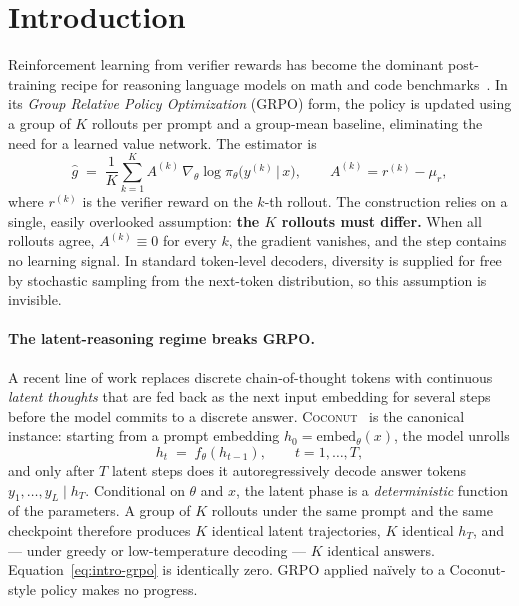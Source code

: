 
\section{Introduction}
\label{sec:intro}

Reinforcement learning from verifier rewards has become the dominant
post-training recipe for reasoning language models on math and code
benchmarks~\citep{shao2024deepseekmath,yu2024dapo}.  In its
\emph{Group Relative Policy Optimization} (GRPO) form, the policy is
updated using a group of $K$ rollouts per prompt and a group-mean
baseline, eliminating the need for a learned value network.  The
estimator is
\begin{equation}
\hat g \;=\; \frac{1}{K} \sum_{k=1}^{K}
  A^{(k)} \, \nabla_\theta \log \pi_\theta\!\big(y^{(k)} \,\big|\, x\big),
\qquad
A^{(k)} = r^{(k)} - \mu_r,
\label{eq:intro-grpo}
\end{equation}
where $r^{(k)}$ is the verifier reward on the $k$-th rollout.  The
construction relies on a single, easily overlooked assumption:
\textbf{the $K$ rollouts must differ.}  When all rollouts agree,
$A^{(k)} \equiv 0$ for every $k$, the gradient vanishes, and the step
contains no learning signal.  In standard token-level decoders,
diversity is supplied for free by stochastic sampling from the next-token
distribution, so this assumption is invisible.

\paragraph{The latent-reasoning regime breaks GRPO.}
A recent line of work replaces discrete chain-of-thought tokens with
continuous \emph{latent thoughts} that are fed back as the next input
embedding for several steps before the model commits to a discrete
answer.  \textsc{Coconut}~\citep{hao2024coconut} is the canonical
instance: starting from a prompt embedding $h_0 = \mathrm{embed}_\theta(x)$,
the model unrolls
\begin{equation}
h_t \;=\; f_\theta(h_{t-1}), \qquad t = 1, \dots, T,
\label{eq:intro-coconut}
\end{equation}
and only after $T$ latent steps does it autoregressively decode answer
tokens $y_1, \dots, y_L \mid h_T$.  Conditional on $\theta$ and $x$, the
latent phase is a \emph{deterministic} function of the parameters.  A
group of $K$ rollouts under the same prompt and the same checkpoint
therefore produces $K$ identical latent trajectories, $K$ identical
$h_T$, and --- under greedy or low-temperature decoding --- $K$ identical
answers.  Equation~\eqref{eq:intro-grpo} is identically zero.  GRPO
applied na\"ively to a Coconut-style policy makes no progress.

